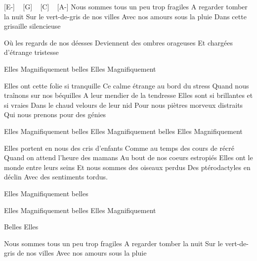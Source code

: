 [E-] ~ [G] ~ [C] ~ [A-]
Nous sommes tous un peu trop fragiles
A regarder tomber la nuit
Sur le vert-de-gris de nos villes
Avec nos amours sous la pluie
Dans cette grisaille silencieuse

Où les regards de nos déesses
Deviennent des ombres orageuses
Et chargées d'étrange tristesse

Elles
Magnifiquement belles
Elles
Magnifiquement

Elles ont cette folie si tranquille
Ce calme étrange au bord du stress
Quand nous traînons sur nos béquilles
A leur mendier de la tendresse
Elles sont si brillantes et si vraies
Dans le chaud velours de leur nid
Pour nous piètres morveux distraits
Qui nous prenons pour des génies


Elles
Magnifiquement belles
Elles
Magnifiquement belles
Elles
Magnifiquement

Elles portent en nous des cris d'enfants
Comme au temps des cours de récré
Quand on attend l'heure des mamans
Au bout de nos coeurs estropiés
Elles ont le monde entre leurs seins
Et nous sommes des oiseaux perdus
Des ptérodactyles en déclin
Avec des sentiments tordus.

Elles
Magnifiquement belles

Elles
Magnifiquement belles
Elles
Magnifiquement

Belles
Elles

Nous sommes tous un peu trop fragiles
A regarder tomber la nuit
Sur le vert-de-gris de nos villes
Avec nos amours sous la pluie